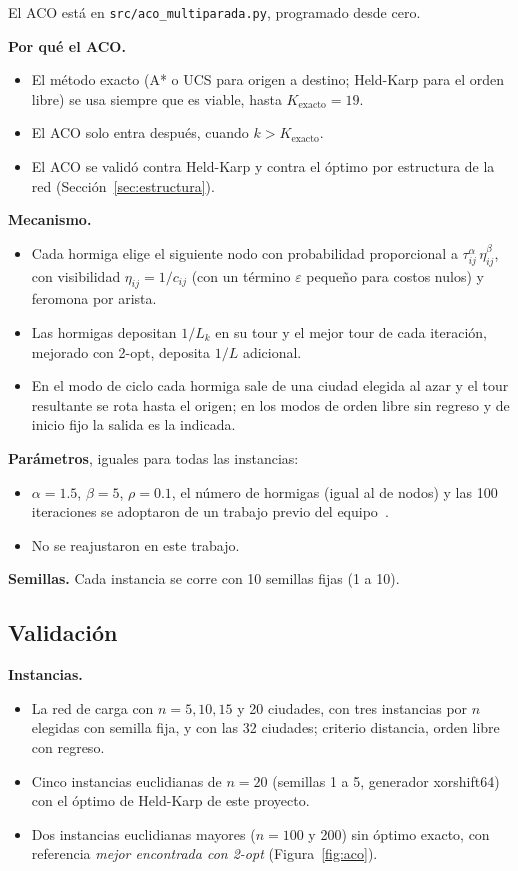 \documentclass[12pt,a4paper]{article}
\begin{document}
El ACO está en \texttt{src/aco\_multiparada.py}, programado desde cero.

\textbf{Por qué el ACO.}
\begin{itemize}
\item El método exacto (A* o UCS para origen a destino; Held-Karp para el orden
libre) se usa siempre que es viable, hasta $K_{\mathrm{exacto}} = 19$.
\item El ACO solo entra después, cuando $k > K_{\mathrm{exacto}}$.
\item El ACO se validó contra Held-Karp y contra el óptimo por estructura de la
red (Sección~\ref{sec:estructura}).
\end{itemize}

\textbf{Mecanismo.}
\begin{itemize}
\item Cada hormiga elige el siguiente nodo con probabilidad proporcional a
$\tau_{ij}^{\alpha}\,\eta_{ij}^{\beta}$, con visibilidad $\eta_{ij} = 1/c_{ij}$
(con un término $\varepsilon$ pequeño para costos nulos) y feromona por arista.
\item Las hormigas depositan $1/L_k$ en su tour y el mejor tour de cada
iteración, mejorado con 2-opt, deposita $1/L$ adicional.
\item En el modo de ciclo cada hormiga sale de una ciudad elegida al azar y el
tour resultante se rota hasta el origen; en los modos de orden libre sin
regreso y de inicio fijo la salida es la indicada.
\end{itemize}

\textbf{Parámetros}, iguales para todas las instancias:
\begin{itemize}
\item $\alpha = 1.5$, $\beta = 5$, $\rho = 0.1$, el número de hormigas (igual
al de nodos) y las 100 iteraciones se adoptaron de un trabajo previo del
equipo~\cite{aco}.
\item No se reajustaron en este trabajo.
\end{itemize}

\textbf{Semillas.} Cada instancia se corre con 10 semillas fijas (1 a 10).

\subsection{Validación}

\textbf{Instancias.}
\begin{itemize}
\item[(a)] La red de carga con $n = 5, 10, 15$ y 20 ciudades, con tres
instancias por $n$ elegidas con semilla fija, y con las 32 ciudades; criterio
distancia, orden libre con regreso.
\item[(b)] Cinco instancias euclidianas de $n = 20$ (semillas 1 a 5, generador
xorshift64) con el óptimo de Held-Karp de este proyecto.
\item[(c)] Dos instancias euclidianas mayores ($n = 100$ y 200) sin óptimo
exacto, con referencia \emph{mejor encontrada con 2-opt}
(Figura~\ref{fig:aco}).
\end{itemize}
\end{document}
